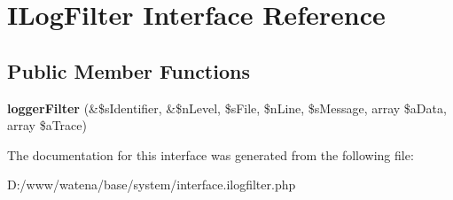 \hypertarget{interface_i_log_filter}{\section{I\-Log\-Filter Interface Reference}
\label{interface_i_log_filter}
}
\subsection*{Public Member Functions}
\begin{DoxyCompactItemize}
\item 
\hypertarget{interface_i_log_filter_aeb5173394e3eefb5cbeb925c18493e99}{{\bfseries logger\-Filter} (\&\$s\-Identifier, \&\$n\-Level, \$s\-File, \$n\-Line, \$s\-Message, array \$a\-Data, array \$a\-Trace)}\label{interface_i_log_filter_aeb5173394e3eefb5cbeb925c18493e99}

\end{DoxyCompactItemize}


The documentation for this interface was generated from the following file\-:\begin{DoxyCompactItemize}
\item 
D\-:/www/watena/base/system/interface.\-ilogfilter.\-php\end{DoxyCompactItemize}
